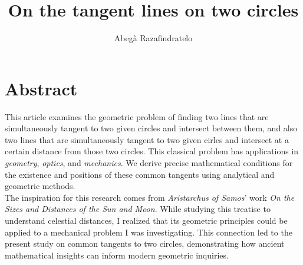 \documentclass{article}
\author{Abegà Razafindratelo}
\title{On the tangent lines on two circles}
\begin{document}
\maketitle

\section*{Abstract}
This article examines the geometric problem of finding two lines that
are simultaneously tangent to two given circles and intersect between
them, and also two lines that are simultaneously tangent to two given
cirles and intersect at a certain distance from those two circles.
This classical problem has applications in \textit{geometry},
\textit{optics}, and \textit{mechanics}. We derive precise
mathematical conditions for the existence and positions of these
common tangents using analytical and geometric methods.\\

The inspiration for this research comes from \textit{Aristarchus of
Samos}' work \textit{On the Sizes and Distances of the Sun and
Moon}\cite{Aristarchus1572}. While studying this treatise to
understand celestial distances, I realized that its geometric
principles could be applied to a mechanical problem I was
investigating. This connection led to the present study on common
tangents to two circles, demonstrating how ancient mathematical
insights can inform modern geometric inquiries.






\end{document}
